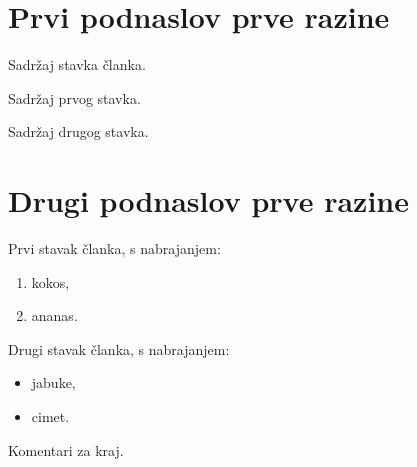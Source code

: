 \documentclass[12pt]{statut}
\begin{document}


\makeFrontMatter

\section{Prvi podnaslov prve razine}

\begin{clanak}
    \stavak
    Sadržaj stavka članka.
\end{clanak}

\begin{clanak}
    \stavak
    Sadržaj prvog stavka.

    \stavak 
    Sadržaj drugog stavka.
\end{clanak}



\section{Drugi podnaslov prve razine}

\begin{clanak}
    \stavak
    Prvi stavak članka, s nabrajanjem:
    \begin{enumerate}
        \item kokos,
        \item ananas.
    \end{enumerate}
    
    \stavak
    Drugi stavak članka, s nabrajanjem:
    \begin{itemize}
        \item jabuke,
        \item cimet.
    \end{itemize}
\end{clanak}

\vspace{3em}

\noindent Komentari za kraj.
\end{document}
